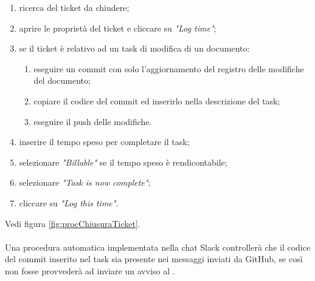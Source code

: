 	            \begin{enumerate}
	            	\item ricerca del ticket da chiudere;
	            	\item aprire le proprietà del ticket e cliccare su \textit{"Log time"};
	            	\item se il ticket è relativo ad un task di modifica di un documento:
	            	\begin{enumerate}
	            		\item eseguire un commit con solo l'aggiornamento del registro delle modifiche del documento;
	            		\item copiare il codice del commit ed inserirlo nella descrizione del task;
	            		\item eseguire il push delle modifiche.
	            	\end{enumerate}
	            	\item inserire il tempo speso per completare il task;
	            	\item selezionare \textit{"Billable"} se il tempo speso è rendicontabile;
	            	\item selezionare \textit{"Task is now complete"};
	            	\item cliccare su \textit{"Log this time"}.
	            \end{enumerate}
	            Vedi figura \ref{fig:procChiusuraTicket}.\\\\
	            Una procedura automatica implementata nella chat Slack controllerà che il codice del commit inserito nel task sia presente nei messaggi inviati da GitHub, se così non fosse provvederà ad inviare un avviso al \responsabilediprogetto.
